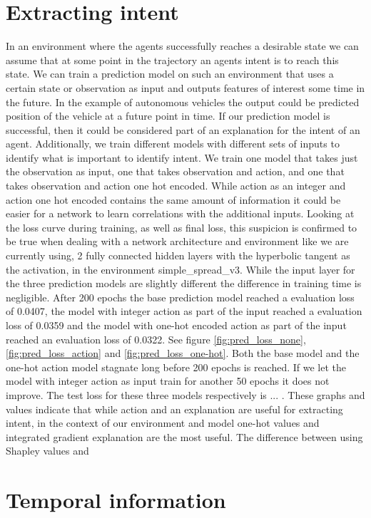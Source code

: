 \documentclass[UKenglish]{uiomasterthesis}
\begin{document}
\section{Extracting intent}
In an environment where the agents successfully reaches a desirable state we can assume that at some point in the trajectory an agents intent is to reach this state. We can train a prediction model on such an environment that uses a certain state or observation as input and outputs features of interest some time in the future. In the example of autonomous vehicles the output could be predicted position of the vehicle at a future point in time. If our prediction model is successful, then it could be considered part of an explanation for the intent of an agent.
Additionally, we train different models with different sets of inputs to identify what is important to identify intent. We train one model that takes just the observation as input, one that takes observation and action, and one that takes observation and action one hot encoded. While action as an integer and action one hot encoded contains the same amount of information it could be easier for a network to learn correlations with the additional inputs. Looking at the loss curve during training, as well as final loss, this suspicion is confirmed to be true when dealing with a network architecture and environment like we are currently using, 2 fully connected hidden layers with the hyperbolic tangent as the activation, in the environment simple\_spread\_v3. While the input layer for the three prediction models are slightly different the difference in training time is negligible. 
After 200 epochs the base prediction model reached a evaluation loss of 0.0407, the model with integer action as part of the input reached a evaluation loss of 0.0359 and the model with one-hot encoded action as part of the input reached an evaluation loss of 0.0322. See figure \ref{fig:pred_loss_none}, \ref{fig:pred_loss_action} and \ref{fig:pred_loss_one-hot}. Both the base model and the one-hot action model stagnate long before 200 epochs is reached. If we let the model with integer action as input train for another 50 epochs it does not improve. The test loss for these three models respectively is ... . These graphs and values indicate that while action and an explanation are useful for extracting intent, in the context of our environment and model one-hot values and integrated gradient explanation are the most useful. The difference between using Shapley values and

\section{Temporal information}
\end{document}
